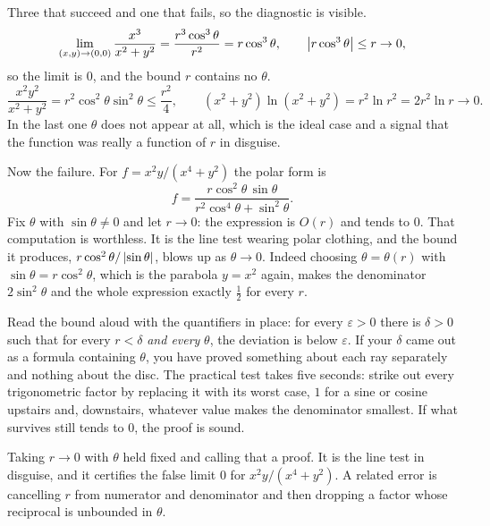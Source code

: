 \begin{worked}
Three that succeed and one that fails, so the diagnostic is visible.
\[\lim_{(x,y)\to(0,0)}\frac{x^{3}}{x^{2}+y^{2}}=\frac{r^{3}\cos^{3}\theta}{r^{2}}=r\cos^{3}\theta,\qquad \left\lvert r\cos^{3}\theta\right\rvert\leq r\to0 ,\]
so the limit is $0$, and the bound $r$ contains no $\theta$.
\[\frac{x^{2}y^{2}}{x^{2}+y^{2}}=r^{2}\cos^{2}\theta\sin^{2}\theta\leq\frac{r^{2}}{4},\qquad (x^{2}+y^{2})\ln(x^{2}+y^{2})=r^{2}\ln r^{2}=2r^{2}\ln r\to0 .\]
In the last one $\theta$ does not appear at all, which is the ideal case and a signal that the function was really a function of $r$ in disguise.

Now the failure. For $f=x^{2}y/(x^{4}+y^{2})$ the polar form is
\[f=\frac{r\cos^{2}\theta\,\sin\theta}{r^{2}\cos^{4}\theta+\sin^{2}\theta}.\]
Fix $\theta$ with $\sin\theta\neq0$ and let $r\to0$: the expression is $O(r)$ and tends to $0$. That computation is worthless. It is the line test wearing polar clothing, and the bound it produces, $r\cos^{2}\theta/\left\lvert \sin\theta\right\rvert$, blows up as $\theta\to0$. Indeed choosing $\theta=\theta(r)$ with $\sin\theta=r\cos^{2}\theta$, which is the parabola $y=x^{2}$ again, makes the denominator $2\sin^{2}\theta$ and the whole expression exactly $\tfrac12$ for every $r$.
\end{worked}

\begin{keynote}
Read the bound aloud with the quantifiers in place: for every $\varepsilon>0$ there is $\delta>0$ such that for every $r<\delta$ \emph{and every} $\theta$, the deviation is below $\varepsilon$. If your $\delta$ came out as a formula containing $\theta$, you have proved something about each ray separately and nothing about the disc. The practical test takes five seconds: strike out every trigonometric factor by replacing it with its worst case, $1$ for a sine or cosine upstairs and, downstairs, whatever value makes the denominator smallest. If what survives still tends to $0$, the proof is sound.
\end{keynote}

\begin{trap}
Taking $r\to0$ with $\theta$ held fixed and calling that a proof. It is the line test in disguise, and it certifies the false limit $0$ for $x^{2}y/(x^{4}+y^{2})$. A related error is cancelling $r$ from numerator and denominator and then dropping a factor whose reciprocal is unbounded in $\theta$.
\end{trap}

